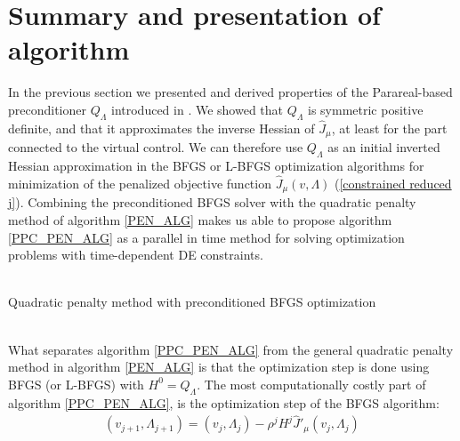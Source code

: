 \section{Summary and presentation of algorithm} \label{Algorithm_sec}
In the previous section we presented and derived properties of the Parareal-based preconditioner $Q_{\Lambda}$ introduced in \cite{maday2002parareal}. We showed that $Q_{\Lambda}$ is symmetric positive definite, and that it approximates the inverse Hessian of $\hat J_{\mu}$, at least for the part connected to the virtual control. We can therefore use $Q_{\Lambda}$ as an initial inverted Hessian approximation in the BFGS or L-BFGS optimization algorithms for minimization of the penalized objective function $\hat J_{\mu}(v,\Lambda)$ (\ref{constrained reduced j}). Combining the preconditioned BFGS solver with the quadratic penalty method of algorithm \ref{PEN_ALG} makes us able to propose algorithm \ref{PPC_PEN_ALG} as a parallel in time method for solving optimization problems with time-dependent DE constraints.
\\
\\
\begin{algorithm}[H] 
\caption{Quadratic penalty method with preconditioned BFGS optimization\label{PPC_PEN_ALG}}
\end{algorithm}
\noindent
\\
What separates algorithm \ref{PPC_PEN_ALG} from the general quadratic penalty method in algorithm \ref{PEN_ALG} is that the optimization step is done using BFGS (or L-BFGS) with $H^0=Q_{\Lambda}$. The most computationally costly part of algorithm \ref{PPC_PEN_ALG}, is the optimization step of the BFGS algorithm:
\begin{align}
(v_{j+1},\Lambda_{j+1}) = (v_j,\Lambda_j) - \rho^j H^j \hat J'_{\mu}(v_j,\Lambda_j) \label{BFGSupdate}
\end{align}
